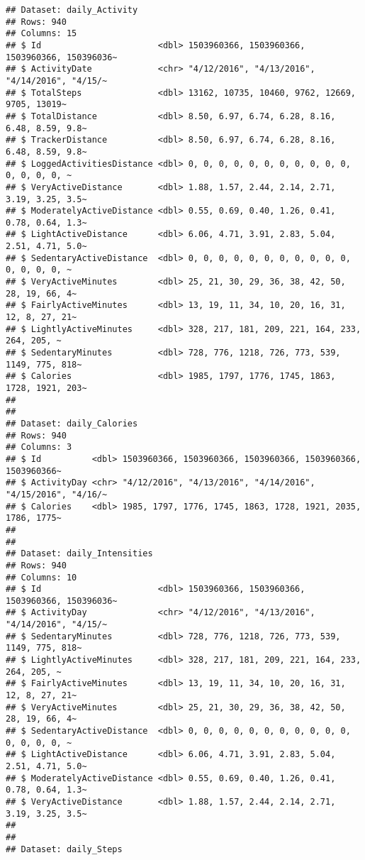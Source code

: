 \documentclass[
]{article}
\begin{document}
\begin{verbatim}
## Dataset: daily_Activity 
## Rows: 940
## Columns: 15
## $ Id                       <dbl> 1503960366, 1503960366, 1503960366, 150396036~
## $ ActivityDate             <chr> "4/12/2016", "4/13/2016", "4/14/2016", "4/15/~
## $ TotalSteps               <dbl> 13162, 10735, 10460, 9762, 12669, 9705, 13019~
## $ TotalDistance            <dbl> 8.50, 6.97, 6.74, 6.28, 8.16, 6.48, 8.59, 9.8~
## $ TrackerDistance          <dbl> 8.50, 6.97, 6.74, 6.28, 8.16, 6.48, 8.59, 9.8~
## $ LoggedActivitiesDistance <dbl> 0, 0, 0, 0, 0, 0, 0, 0, 0, 0, 0, 0, 0, 0, 0, ~
## $ VeryActiveDistance       <dbl> 1.88, 1.57, 2.44, 2.14, 2.71, 3.19, 3.25, 3.5~
## $ ModeratelyActiveDistance <dbl> 0.55, 0.69, 0.40, 1.26, 0.41, 0.78, 0.64, 1.3~
## $ LightActiveDistance      <dbl> 6.06, 4.71, 3.91, 2.83, 5.04, 2.51, 4.71, 5.0~
## $ SedentaryActiveDistance  <dbl> 0, 0, 0, 0, 0, 0, 0, 0, 0, 0, 0, 0, 0, 0, 0, ~
## $ VeryActiveMinutes        <dbl> 25, 21, 30, 29, 36, 38, 42, 50, 28, 19, 66, 4~
## $ FairlyActiveMinutes      <dbl> 13, 19, 11, 34, 10, 20, 16, 31, 12, 8, 27, 21~
## $ LightlyActiveMinutes     <dbl> 328, 217, 181, 209, 221, 164, 233, 264, 205, ~
## $ SedentaryMinutes         <dbl> 728, 776, 1218, 726, 773, 539, 1149, 775, 818~
## $ Calories                 <dbl> 1985, 1797, 1776, 1745, 1863, 1728, 1921, 203~
## 
## 
## Dataset: daily_Calories 
## Rows: 940
## Columns: 3
## $ Id          <dbl> 1503960366, 1503960366, 1503960366, 1503960366, 1503960366~
## $ ActivityDay <chr> "4/12/2016", "4/13/2016", "4/14/2016", "4/15/2016", "4/16/~
## $ Calories    <dbl> 1985, 1797, 1776, 1745, 1863, 1728, 1921, 2035, 1786, 1775~
## 
## 
## Dataset: daily_Intensities 
## Rows: 940
## Columns: 10
## $ Id                       <dbl> 1503960366, 1503960366, 1503960366, 150396036~
## $ ActivityDay              <chr> "4/12/2016", "4/13/2016", "4/14/2016", "4/15/~
## $ SedentaryMinutes         <dbl> 728, 776, 1218, 726, 773, 539, 1149, 775, 818~
## $ LightlyActiveMinutes     <dbl> 328, 217, 181, 209, 221, 164, 233, 264, 205, ~
## $ FairlyActiveMinutes      <dbl> 13, 19, 11, 34, 10, 20, 16, 31, 12, 8, 27, 21~
## $ VeryActiveMinutes        <dbl> 25, 21, 30, 29, 36, 38, 42, 50, 28, 19, 66, 4~
## $ SedentaryActiveDistance  <dbl> 0, 0, 0, 0, 0, 0, 0, 0, 0, 0, 0, 0, 0, 0, 0, ~
## $ LightActiveDistance      <dbl> 6.06, 4.71, 3.91, 2.83, 5.04, 2.51, 4.71, 5.0~
## $ ModeratelyActiveDistance <dbl> 0.55, 0.69, 0.40, 1.26, 0.41, 0.78, 0.64, 1.3~
## $ VeryActiveDistance       <dbl> 1.88, 1.57, 2.44, 2.14, 2.71, 3.19, 3.25, 3.5~
## 
## 
## Dataset: daily_Steps 

\end{verbatim}
\end{document}
